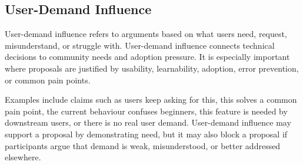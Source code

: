 \subsection{User-Demand Influence}

User-demand influence refers to arguments based on what users need, request, misunderstand, or struggle with. User-demand influence connects technical decisions to community needs and adoption pressure. It is especially important where proposals are justified by usability, learnability, adoption, error prevention, or common pain points.

Examples include claims such as users keep asking for this, this solves a common pain point, the current behaviour confuses beginners, this feature is needed by downstream users, or there is no real user demand. User-demand influence may support a proposal by demonstrating need, but it may also block a proposal if participants argue that demand is weak, misunderstood, or better addressed elsewhere.

